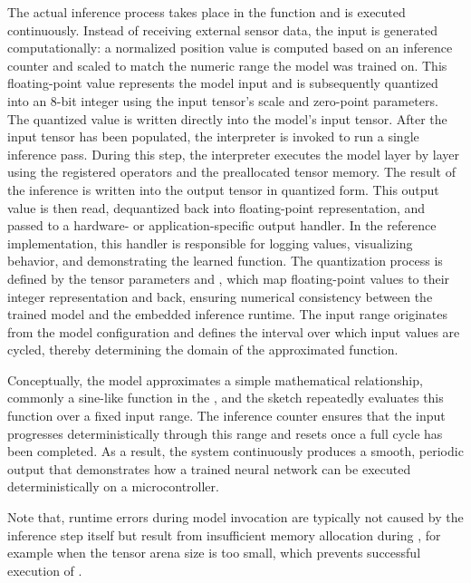 The actual inference process takes place in the  function and is executed continuously. Instead of receiving external sensor data, the input is generated computationally: a normalized position value is computed based on an inference counter and scaled to match the numeric range the model was trained on. This floating-point value represents the model input and is subsequently quantized into an 8-bit integer using the input tensor’s scale and zero-point parameters. The quantized value is written directly into the model’s input tensor. After the input tensor has been populated, the interpreter is invoked to run a single inference pass. During this step, the interpreter executes the model layer by layer using the registered operators and the preallocated tensor memory. The result of the inference is written into the output tensor in quantized form. This output value is then read, dequantized back into floating-point representation, and passed to a hardware- or application-specific output handler. In the reference implementation, this handler is responsible for logging values, visualizing behavior, and demonstrating the learned function. The quantization process is defined by the tensor parameters  and , which map floating-point values to their integer representation and back, ensuring numerical consistency between the trained model and the embedded inference runtime. The input range  originates from the model configuration and defines the interval over which input values are cycled, thereby determining the domain of the approximated function. 


Conceptually, the model approximates a simple mathematical relationship, commonly a sine-like function in the , and the sketch repeatedly evaluates this function over a fixed input range. The inference counter ensures that the input progresses deterministically through this range and resets once a full cycle has been completed. As a result, the system continuously produces a smooth, periodic output that demonstrates how a trained neural network can be executed deterministically on a microcontroller.

Note that, runtime errors during model invocation are typically not caused by the inference step itself but result from insufficient memory allocation during , for example when the tensor arena size is too small, which prevents successful execution of .



\begin{center}
	
	\label{lst:TensorFlow}
\end{center}




